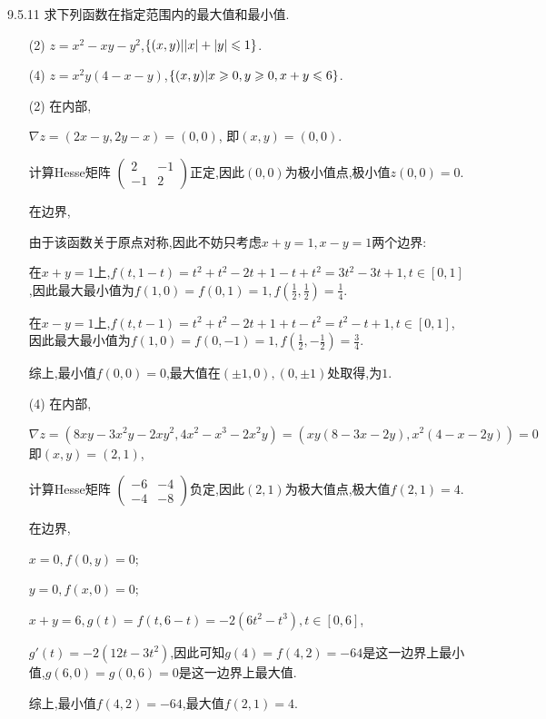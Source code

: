 \begin{exercise}{9.5.11}
    求下列函数在指定范围内的最大值和最小值.
    \begin{enumerate}
        \item[(2)] $z=x^2-xy-y^2$,$\{(x,y)| |x|+|y|\leqslant 1\}$.
        \item[(4)] $z=x^2y(4-x-y)$,$\{(x,y)| x\geqslant 0,y\geqslant 0,x+y\leqslant 6\}$. 
    \end{enumerate}
\end{exercise}
\begin{solution}
    \begin{enumerate}
        \item[(2)] 在内部,
        
        $\nabla z=(2x-y,2y-x)=(0,0)$,
        即$(x,y)=(0,0)$.

        计算Hesse矩阵 $\begin{pmatrix}
            2&-1\\
            -1&2
        \end{pmatrix}$正定,因此$(0,0)$为极小值点,极小值$z(0,0)=0$.
        
        在边界,
        
        由于该函数关于原点对称,因此不妨只考虑$x+y=1,x-y=1$两个边界:

        在$x+y=1$上,$f(t,1-t)=t^2+t^2-2t+1-t+t^2=3t^2-3t+1,t\in[0,1]$,因此最大最小值为$f(1,0)=f(0,1)=1,f(\frac{1}{2},\frac{1}{2})=\frac{1}{4}$.
        
        在$x-y=1$上,$f(t,t-1)=t^2+t^2-2t+1+t-t^2=t^2-t+1,t\in[0,1]$,因此最大最小值为$f(1,0)=f(0,-1)=1,f(\frac{1}{2},-\frac{1}{2})=\frac{3}{4}$.
        
        综上,最小值$f(0,0)=0$,最大值在$(\pm1,0),(0,\pm1)$处取得,为$1$.

        \item[(4)] 在内部,
        
        $\nabla z=(8xy-3x^2y-2xy^2,4x^2-x^3-2x^2y)=(xy(8-3x-2y),x^2(4-x-2y))=0$
        即$(x,y)=(2,1)$,

        计算Hesse矩阵 $\begin{pmatrix}
            -6&-4\\
            -4&-8
        \end{pmatrix}$负定,因此$(2,1)$为极大值点,极大值$f(2,1)=4$.

        在边界,
        
        $x=0,f(0,y)=0$;
        
        $y=0,f(x,0)=0$;
        
        $x+y=6,g(t)=f(t,6-t)=-2(6t^2-t^3),t\in[0,6]$,

        $g'(t)=-2(12t-3t^2)$,因此可知$g(4)=f(4,2)=-64$是这一边界上最小值,$g(6,0)=g(0,6)=0$是这一边界上最大值.

        综上,最小值$f(4,2)=-64$,最大值$f(2,1)=4$.
    \end{enumerate}
\end{solution}

